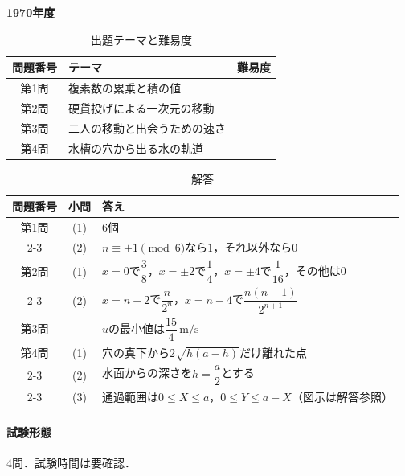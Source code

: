 \documentclass[../../main.tex]{subfiles}
\begin{document}
\begin{center}
  {\fontsize{48pt}{58pt}\selectfont \textbf{1970}\normalsize\textbf{年度}}
\end{center}

\begin{table}[htb]
  \centering
  \caption{出題テーマと難易度}
  \begin{tabular}{|c|p{9cm}|c|}
    \hline
    \textbf{問題番号} & \textbf{テーマ} & \textbf{難易度} \\
    \hline
    第1問 & 複素数の累乗と積の値 & \\
    \hline
    第2問 & 硬貨投げによる一次元の移動 & \\
    \hline
    第3問 & 二人の移動と出会うための速さ & \\
    \hline
    第4問 & 水槽の穴から出る水の軌道 & \\
    \hline
  \end{tabular}
\end{table}

\begin{table}[htb]
  \centering
  \caption{解答}
  \renewcommand{\arraystretch}{1.4}
  \begin{tabular}{|c|c|p{9cm}|}
    \hline
    \textbf{問題番号} & \textbf{小問} & \textbf{答え} \\
    \hline
    第1問 & (1) & $6$個 \\
    \cline{2-3}
    & (2) & $n\equiv\pm1\pmod{6}$なら$1$，それ以外なら$0$ \\
    \hline
    第2問 & (1) & $x=0$で$\dfrac{3}{8}$，$x=\pm2$で$\dfrac{1}{4}$，$x=\pm4$で$\dfrac{1}{16}$，その他は$0$ \\
    \cline{2-3}
    & (2) & $x=n-2$で$\dfrac{n}{2^n}$，$x=n-4$で$\dfrac{n(n-1)}{2^{n+1}}$ \\
    \hline
    第3問 & -- & $u$の最小値は$\dfrac{15}{4}\,\mathrm{m/s}$ \\
    \hline
    第4問 & (1) & 穴の真下から$2\sqrt{h(a-h)}$だけ離れた点 \\
    \cline{2-3}
    & (2) & 水面からの深さを$h=\dfrac{a}{2}$とする \\
    \cline{2-3}
    & (3) & 通過範囲は$0\le X\le a$，$0\le Y\le a-X$（図示は解答参照） \\
    \hline
  \end{tabular}
\end{table}

\paragraph{試験形態}
4問．試験時間は要確認．
\end{document}
